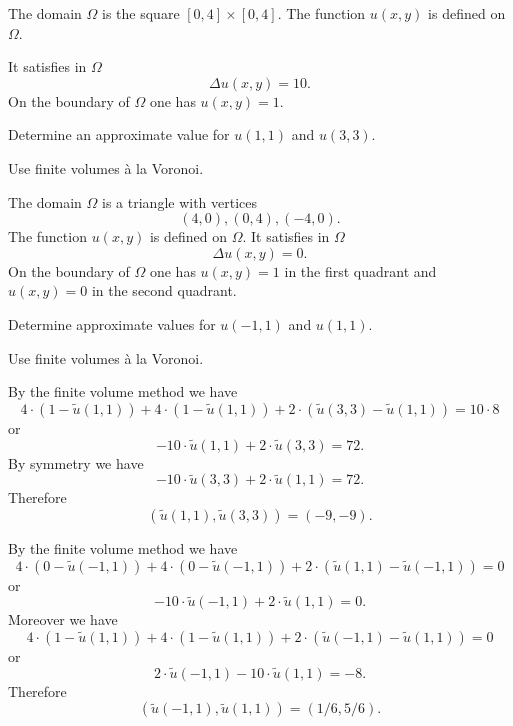 \begin{teilaufgaben}
\item
The domain $\Omega$ is the square $[0,4] \times [0, 4]$.
The function $u(x,y)$ is defined on $\Omega$. 

It satisfies in $\Omega$ 
\[
\Delta u(x,y) = 10.
\]
On the boundary of $\Omega$ one has $u(x,y) = 1$. 

Determine an approximate value for $u(1,1)$ and $u(3,3)$. 

Use finite volumes \`a la Voronoi.  

\item
The domain $\Omega$ is a triangle with vertices
\[
(4,0), (0,4), (-4, 0).
\]
The function $u(x,y)$ is defined on $\Omega$.
It satisfies in $\Omega$ 
\[
\Delta u(x,y) = 0.
\]
On the boundary of $\Omega$ one has $u(x,y) = 1$ in the first quadrant
and $u(x,y) = 0$ in the second quadrant.

Determine approximate values for $u(-1,1)$ and $u(1,1)$.

Use finite volumes \`a la Voronoi.  
\end{teilaufgaben}

\begin{loesung}
\begin{teilaufgaben}
\item
By the finite volume method we have
\[
4 \cdot (1 - \tilde u(1,1)) + 4 \cdot (1 - \tilde u(1,1))
+ 2 \cdot (\tilde u(3,3) - \tilde u(1,1))
=
10 \cdot 8
\]
or
\begin{equation}
-10 \cdot \tilde u(1,1) + 2 \cdot \tilde u(3,3) = 72.
\tag{\bf 1P}
\end{equation}
By symmetry we have
\begin{equation}
-10 \cdot \tilde u(3,3) + 2 \cdot \tilde u(1,1) = 72.
\tag{\bf 1P}
\end{equation}
Therefore
\begin{equation}
(\tilde u(1,1), \tilde u(3,3)) = (-9, -9).
\tag{\bf 1P}
\end{equation}

\item
By the finite volume method we have
\[
4 \cdot (0 - \tilde u(-1,1)) + 4 \cdot (0 - \tilde u(-1,1))
+ 2 \cdot (\tilde u(1,1) - \tilde u(-1,1))
= 0
\]
or
\begin{equation}
-10 \cdot \tilde u(-1,1) + 2 \cdot \tilde u(1,1) = 0.
\tag{\bf 1P}
\end{equation}
Moreover we have
\[
4 \cdot (1 - \tilde u(1,1)) + 4 \cdot (1 - \tilde u(1,1))
+ 2 \cdot (\tilde u(-1,1) - \tilde u(1,1))
= 0
\]
or
\begin{equation}
2 \cdot \tilde u(-1,1) - 10 \cdot \tilde u(1,1) = -8.
\tag{\bf 1P}
\end{equation}
Therefore
\begin{equation}
(\tilde u(-1,1), \tilde u(1,1)) = (1/6, 5/6).
\tag{\bf 1P}
\end{equation}
\end{teilaufgaben}
\end{loesung}

